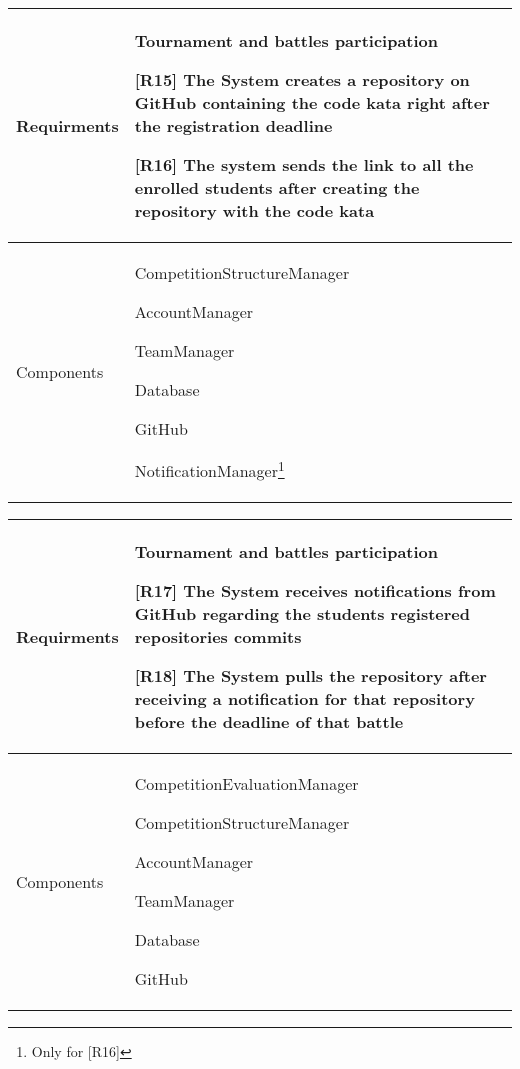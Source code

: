     
     \begin{table}[!h]
        \centering
        \begin{tabular}{ | m{6em} | m{30em} |} 
            \hline
             Requirments& \textbf{Tournament and battles participation}
             
             [R15] The System creates a repository on GitHub containing the code kata right after the registration deadline
             
    [R16] The system sends the link to all the enrolled students after creating the repository with the code kata
             \\
            \hline
             Components& 
             
             CompetitionStructureManager

             AccountManager

             TeamManager
             
             Database

             GitHub
             
             NotificationManager\footnote{Only for [R16]}
             \\
             \hline
        \end{tabular}
        \label{tab:my_label}
    \end{table}

    \begin{table}[!h]
        \centering
        \begin{tabular}{ | m{6em} | m{30em} |} 
            \hline
             Requirments& \textbf{Tournament and battles participation}
             
             [R17] The System receives notifications from GitHub regarding the students registered repositories commits
    
    
    [R18] The System pulls the repository after receiving a notification for that repository before the deadline of that battle
             \\
            \hline
             Components& 
             CompetitionEvaluationManager
             
             
             CompetitionStructureManager

             AccountManager

             TeamManager
             
             Database

             GitHub
             \\
             \hline
        \end{tabular}
        \label{tab:my_label}
    \end{table}


